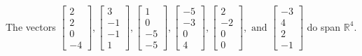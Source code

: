 \begin{exercise}
\begin{exerciseStatement}
  \end{exerciseStatement}
  \begin{exerciseAnswer}
   The vectors \(\left[\begin{array}{r}
2 \\
2 \\
0 \\
-4
\end{array}\right] , \left[\begin{array}{r}
3 \\
-1 \\
-1 \\
1
\end{array}\right] , \left[\begin{array}{r}
1 \\
0 \\
-5 \\
-5
\end{array}\right] , \left[\begin{array}{r}
-5 \\
-3 \\
0 \\
4
\end{array}\right] , \left[\begin{array}{r}
2 \\
-2 \\
0 \\
0
\end{array}\right] , \text{ and } \left[\begin{array}{r}
-3 \\
4 \\
2 \\
-1
\end{array}\right]\) 
  	 do  
	span \(\mathbb{R}^4\).
  


  \end{exerciseAnswer}
\end{exercise}